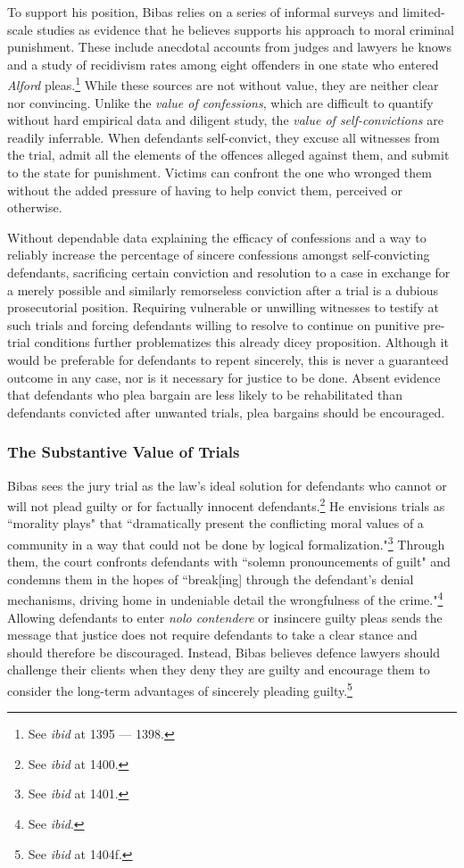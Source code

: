To support his position, Bibas relies on a series of informal surveys and limited-scale studies as evidence that he believes supports his approach to moral criminal punishment. These include anecdotal accounts from judges and lawyers he knows and a study of recidivism rates among eight offenders in one state who entered \textit{Alford} pleas.\footnote{See \textit{ibid} at 1395 — 1398.} While these sources are not without value, they are neither clear nor convincing. Unlike the \textit{value of confessions}, which are difficult to quantify without hard empirical data and diligent study, the \textit{value of self-convictions} are readily inferrable. When defendants self-convict, they excuse all witnesses from the trial, admit all the elements of the offences alleged against them, and submit to the state for punishment. Victims can confront the one who wronged them without the added pressure of having to help convict them, perceived or otherwise. 

Without dependable data explaining the efficacy of confessions and a way to reliably increase the percentage of sincere confessions amongst self-convicting defendants, sacrificing certain conviction and resolution to a case in exchange for a merely possible and similarly remorseless conviction after a trial is a dubious prosecutorial position. Requiring vulnerable or unwilling witnesses to testify at such trials and forcing defendants willing to resolve to continue on punitive pre-trial conditions further problematizes this already dicey proposition. Although it would be preferable for defendants to repent sincerely, this is never a guaranteed outcome in any case, nor is it necessary for justice to be done. Absent evidence that defendants who plea bargain are less likely to be rehabilitated than defendants convicted after unwanted trials, plea bargains should be encouraged.

\subsubsection{The Substantive Value of Trials}

Bibas sees the jury trial as the law's ideal solution for defendants who cannot or will not plead guilty or for factually innocent defendants.\footnote{See \textit{ibid} at 1400.} He envisions trials as ``morality plays" that ``dramatically present the conflicting moral values of a community in a way that could not be done by logical formalization."\footnote{See \textit{ibid} at 1401.} Through them, the court confronts defendants with ``solemn pronouncements of guilt" and condemns them in the hopes of ``break[ing] through the defendant's denial mechanisms, driving home in undeniable detail the wrongfulness of the crime."\footnote{See \textit{ibid}.} Allowing defendants to enter \textit{nolo contendere} or insincere guilty pleas sends the message that justice does not require defendants to take a clear stance and should therefore be discouraged. Instead, Bibas believes defence lawyers should challenge their clients when they deny they are guilty and encourage them to consider the long-term advantages of sincerely pleading guilty.\footnote{See \textit{ibid} at 1404f.}

